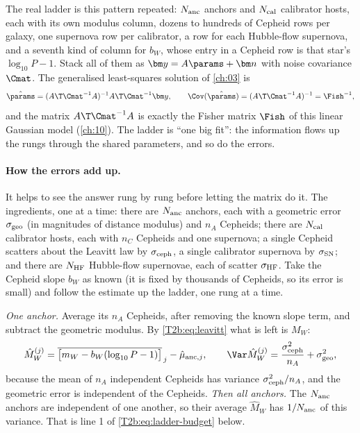The real ladder is this pattern repeated: $N_{\rm anc}$ anchors and $N_{\rm cal}$ calibrator hosts, each with its own modulus column, dozens to hundreds of Cepheid rows per galaxy, one supernova row per calibrator, a row for each Hubble-flow supernova, and a seventh kind of column for $b_W$, whose entry in a Cepheid row is that star's $\log_{10}P-1$. Stack all of them as $\bm y=A\params+\bm n$ with noise covariance $\Cmat$. The generalised least-squares solution of \cref{ch:03} is
\begin{equation}
  \hat\params=(A\T\Cmat^{-1}A)^{-1}A\T\Cmat^{-1}\bm y,\qquad
  \Cov(\hat\params)=(A\T\Cmat^{-1}A)^{-1}=\Fish^{-1},
  \label{T2b:eq:gls}
\end{equation}
and the matrix $A\T\Cmat^{-1}A$ is exactly the Fisher matrix $\Fish$ of this linear Gaussian model (\cref{ch:10}). The ladder is ``one big fit'': the information flows up the rungs through the shared parameters, and so do the errors.

\paragraph{How the errors add up.} It helps to see the answer rung by rung before letting the matrix do it. The ingredients, one at a time: there are $N_{\rm anc}$ anchors, each with a geometric error $\sigma_{\rm geo}$ (in magnitudes of distance modulus) and $n_A$ Cepheids; there are $N_{\rm cal}$ calibrator hosts, each with $n_C$ Cepheids and one supernova; a single Cepheid scatters about the Leavitt law by $\sigma_{\rm ceph}$, a single calibrator supernova by $\sigma_{\rm SN}$; and there are $N_{\rm HF}$ Hubble-flow supernovae, each of scatter $\sigma_{\rm HF}$. Take the Cepheid slope $b_W$ as known (it is fixed by thousands of Cepheids, so its error is small) and follow the estimate up the ladder, one rung at a time.

\emph{One anchor.} Average its $n_A$ Cepheids, after removing the known slope term, and subtract the geometric modulus. By \eqref{T2b:eq:leavitt} what is left is $M_W$:
\[
  \hat M_W^{(j)}=\overline{\big[m_W-b_W(\log_{10}P-1)\big]}_{\,j}-\hat\mu_{{\rm anc},j},
  \qquad
  \Var\hat M_W^{(j)}=\frac{\sigma_{\rm ceph}^2}{n_A}+\sigma_{\rm geo}^2 ,
\]
because the mean of $n_A$ independent Cepheids has variance $\sigma_{\rm ceph}^2/n_A$, and the geometric error is independent of the Cepheids. \emph{Then all anchors.} The $N_{\rm anc}$ anchors are independent of one another, so their average $\hat M_W$ has $1/N_{\rm anc}$ of this variance. That is line 1 of \eqref{T2b:eq:ladder-budget} below.


